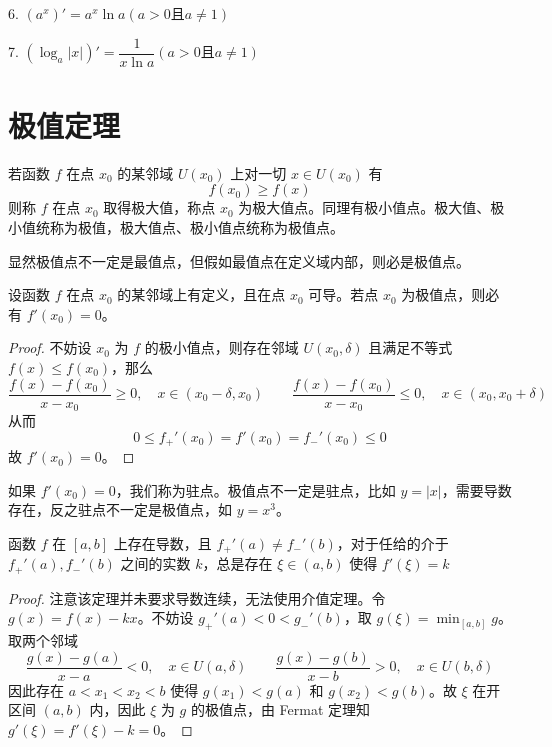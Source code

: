 6. $(a^x)'=a^x \ln a(a>0\text{且}a\ne 1)$

7. $(\log_a|x|)'=\dfrac{1}{x\ln a}(a>0\text{且}a\ne 1)$

\section{极值定理}

若函数 $f$ 在点 $x_0$ 的某邻域 $U(x_0)$ 上对一切 $x\in U(x_0)$ 有
\[ f(x_0) \geqslant f(x) \]
则称 $f$ 在点 $x_0$ 取得极大值，称点 $x_0$ 为极大值点。同理有极小值点。极大值、极小值统称为极值，极大值点、极小值点统称为极值点。

显然极值点不一定是最值点，但假如最值点在定义域内部，则必是极值点。

\begin{theorem}[Fermat 定理]
	设函数 $f$ 在点 $x_0$ 的某邻域上有定义，且在点 $x_0$ 可导。若点 $x_0$ 为极值点，则必有 $f'(x_0)=0$。
\end{theorem}

\begin{proof}
	不妨设 $x_0$ 为 $f$ 的极小值点，则存在邻域 $U(x_0, \delta)$ 且满足不等式 $f(x) \leqslant f(x_0)$，那么
	\[ \frac{f(x) - f(x_0)}{x - x_0} \geqslant 0, \quad x \in (x_0 - \delta, x_0) \qquad
		\frac{f(x) - f(x_0)}{x - x_0} \leqslant 0, \quad x \in (x_0, x_0 + \delta) \]
	从而
	\[ 0 \leqslant f_+'(x_0) = f'(x_0) = f_-'(x_0) \leqslant 0 \]
	故 $f'(x_0) = 0$。
\end{proof}

如果 $f'(x_0) = 0$，我们称为驻点。极值点不一定是驻点，比如 $y = |x|$，需要导数存在，反之驻点不一定是极值点，如 $y = x^3$。

\begin{theorem}[Darboux 定理]
	函数 $f$ 在 $[a, b]$ 上存在导数，且 $f_{+}'(a) \neq f_{-}'(b)$，对于任给的介于 $f_{+}'(a), f_{-}'(b)$ 之间的实数 $k$，总是存在 $\xi \in (a, b)$ 使得 $f'(\xi) = k$
\end{theorem}

\begin{proof}
	注意该定理并未要求导数连续，无法使用介值定理。令 $g(x) = f(x) - kx$。不妨设 $g_{+}'(a) < 0 < g_{-}'(b)$，取 $g(\xi) = \min_{[a, b]} g$。取两个邻域
	\[ \frac{g(x) - g(a)}{x - a} < 0, \quad x \in U(a, \delta) \qquad
		\frac{g(x) - g(b)}{x - b} > 0, \quad x \in U(b, \delta) \]
	因此存在 $a < x_1 < x_2 < b$ 使得 $g(x_1) < g(a)$ 和 $g(x_2) < g(b)$。故 $\xi$ 在开区间 $(a, b)$ 内，因此 $\xi$ 为 $g$ 的极值点，由 Fermat 定理知 $g'(\xi) = f'(\xi) - k = 0$。
\end{proof}

